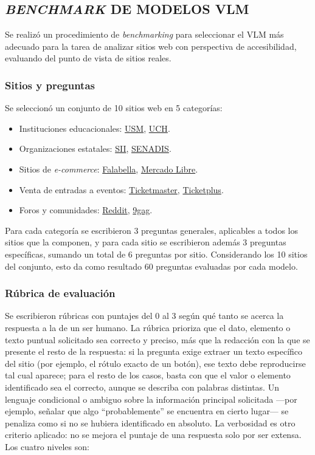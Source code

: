 \subsection{\textit{BENCHMARK} DE MODELOS VLM}
\label{sec:benchmark}

Se realizó un procedimiento de \textit{benchmarking} para seleccionar el VLM más adecuado para la tarea de analizar sitios web con perspectiva de accesibilidad, evaluando del punto de vista de sitios reales.

\subsubsection{Sitios y preguntas}

Se seleccionó un conjunto de 10 sitios web en 5 categorías:

\begin{itemize}
    \item Instituciones educacionales: \href{https://www.usm.cl}{USM}, \href{https://www.uchile.cl}{UCH}.
    \item Organizaciones estatales: \href{https://www.sii.cl}{SII}, \href{https://www.senadis.gob.cl}{SENADIS}.
    \item Sitios de \textit{e-commerce}: \href{https://www.falabella.com/falabella-cl}{Falabella}, \href{https://www.mercadolibre.cl}{Mercado Libre}.
    \item Venta de entradas a eventos: \href{https://www.ticketmaster.cl}{Ticketmaster}, \href{https://www.ticketplus.cl}{Ticketplus}.
    \item Foros y comunidades: \href{https://www.reddit.com}{Reddit}, \href{https://9gag.com}{9gag}.
\end{itemize}

Para cada categoría se escribieron 3 preguntas generales, aplicables a todos los sitios que la componen, y para cada sitio se escribieron además 3 preguntas específicas, sumando un total de 6 preguntas por sitio. Considerando los 10 sitios del conjunto, esto da como resultado 60 preguntas evaluadas por cada modelo.

\subsubsection{Rúbrica de evaluación}

Se escribieron rúbricas con puntajes del 0 al 3 según qué tanto se acerca la respuesta a la de un ser humano. La rúbrica prioriza que el dato, elemento o texto puntual solicitado sea correcto y preciso, más que la redacción con la que se presente el resto de la respuesta: si la pregunta exige extraer un texto específico del sitio (por ejemplo, el rótulo exacto de un botón), ese texto debe reproducirse tal cual aparece; para el resto de los casos, basta con que el valor o elemento identificado sea el correcto, aunque se describa con palabras distintas. Un lenguaje condicional o ambiguo sobre la información principal solicitada —por ejemplo, señalar que algo ``probablemente'' se encuentra en cierto lugar— se penaliza como si no se hubiera identificado en absoluto. La verbosidad es otro criterio aplicado: no se mejora el puntaje de una respuesta solo por ser extensa. Los cuatro niveles son:

